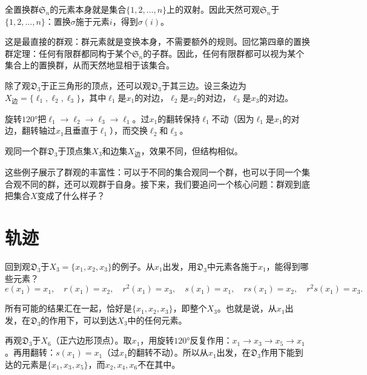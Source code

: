 \documentclass[12pt,UTF8,fontset=none]{ctexbook}
\begin{document}
\begin{ex}
全置换群$\mathfrak{S}_n$的元素本身就是集合$\{1, 2, \ldots, n\}$上的双射。因此天然可观$\mathfrak{S}_n$于$\{1, 2, \ldots, n\}$：置换$\sigma$施于元素$i$，得到$\sigma(i)$。

这是最直接的群观：群元素就是变换本身，不需要额外的规则。回忆第四章的置换群定理：任何有限群都同构于某个$\mathfrak{S}_n$的子群。因此，任何有限群都可以视为某个集合上的置换群，从而天然地显相于该集合。
\end{ex}

\begin{et}
除了观$\mathfrak{D}_3$于正三角形的顶点，还可以观$\mathfrak{D}_3$于其三边。设三条边为$X_{\text{边}} = \{\ell_1, \ell_2, \ell_3\}$，其中$\ell_1$是$x_1$的对边，$\ell_2$是$x_2$的对边，$\ell_3$是$x_3$的对边。

旋转$120°$把$\ell_1 \to \ell_2 \to \ell_3 \to \ell_1$。过$x_1$的翻转保持$\ell_1$不动（因为$\ell_1$是$x_1$的对边，翻转轴过$x_1$且垂直于$\ell_1$），而交换$\ell_2$和$\ell_3$。

观同一个群$\mathfrak{D}_3$于顶点集$X_3$和边集$X_{\text{边}}$，效果不同，但结构相似。

\end{et}

这些例子展示了群观的丰富性：可以于不同的集合观同一个群，也可以于同一个集合观不同的群，还可以观群于自身。接下来，我们要追问一个核心问题：群观到底把集合$X$变成了什么样子？

\section{轨迹}

回到观$\mathfrak{D}_3$于$X_3 = \{x_1, x_2, x_3\}$的例子。从$x_1$出发，用$\mathfrak{D}_3$中元素各施于$x_1$，能得到哪些元素？
\[
e(x_1) = x_1,\quad r(x_1) = x_2,\quad r^2(x_1) = x_3,\quad s(x_1) = x_1,\quad rs(x_1) = x_2,\quad r^2s(x_1) = x_3.
\]

所有可能的结果汇在一起，恰好是$\{x_1, x_2, x_3\}$，即整个$X_3$。也就是说，从$x_1$出发，在$\mathfrak{D}_3$的作用下，可以到达$X_3$中的任何元素。

再观$\mathfrak{D}_3$于$X_6$（正六边形顶点）。取$x_1$，用旋转$120°$反复作用：$x_1 \to x_3 \to x_5 \to x_1$。再用翻转：$s(x_1) = x_1$（过$x_1$的翻转不动）。所以从$x_1$出发，在$\mathfrak{D}_3$作用下能到达的元素是$\{x_1, x_3, x_5\}$，而$x_2, x_4, x_6$不在其中。
\end{document}

